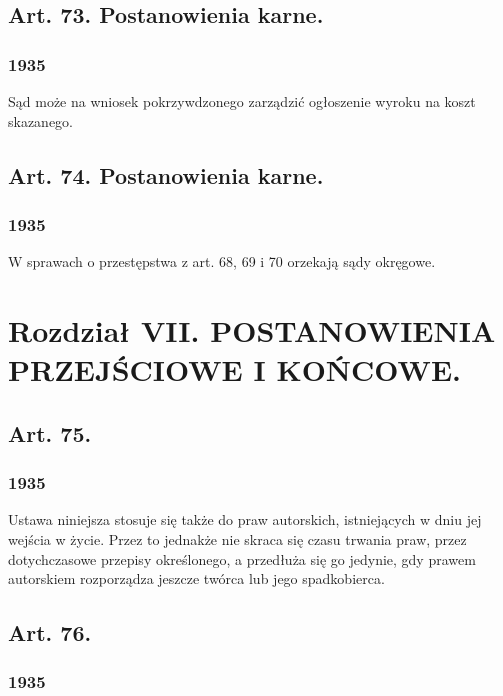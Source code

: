 \documentclass[withmarginpar]{book}
\begin{document}
\section{Art. 73. Postanowienia karne.}
\label{sec:art.-73}
\subsection{1935}
\label{sec:art.-73-1}

Sąd może na wniosek pokrzywdzonego zarządzić ogłoszenie wyroku na
koszt skazanego.

\section{Art. 74. Postanowienia karne.}
\label{sec:art.-74}
\subsection{1935}
\label{sec:art.-74-1}

W sprawach o przestępstwa z art. 68, 69 i 70 orzekają sądy okręgowe.

\chapter{Rozdział   VII. POSTANOWIENIA PRZEJŚCIOWE I KOŃCOWE.}
\label{cha:r-o-z-5}

\section{Art. 75.}
\label{sec:art.-75}
\subsection{1935}
\label{sec:art.-75-1}

Ustawa niniejsza stosuje się także do praw autorskich, istniejących w
dniu jej wejścia w życie. Przez to jednakże nie skraca się czasu
trwania praw, przez dotychczasowe przepisy określonego, a przedłuża
się go jedynie, gdy prawem autorskiem rozporządza jeszcze twórca lub
jego spadkobierca.

\section{Art. 76.}
\label{sec:art.-76}
\subsection{1935}
\label{sec:art.-76-1}
\end{document}
